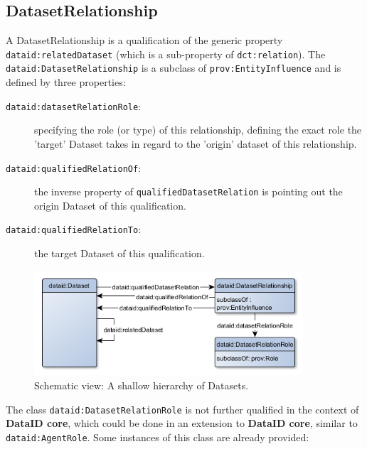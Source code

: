 \documentclass[a4paper,english,twoside,BCOR1.5cm,headsepline,DIV12,appendixprefix,final,12pt]{scrbook}
\newcommand{\core}{{\ttfamily\bfseries DataID core}\xspace}
\newcommand{\prop}[1]{{{\texttt{#1}}}}
\begin{document}
\subsection{DatasetRelationship} 
\label{sec:corerelation}
A DatasetRelationship is a qualification of the generic property \prop{dataid:relatedDataset} (which is a sub-property of \prop{dct:relation}). The \prop{dataid:DatasetRelationship} is a subclass of \prop{prov:EntityInfluence} and is defined by three properties:

\begin{description}
\item[\prop{dataid:datasetRelationRole}:] specifying the role (or type) of this relationship, defining the exact role the 'target' Dataset takes in regard to the 'origin' dataset of this relationship.
\item[\prop{dataid:qualifiedRelationOf}:] the inverse property of \prop{qualifiedDatasetRelation} is pointing out the origin Dataset of this qualification.
\item[\prop{dataid:qualifiedRelationTo}:] the target Dataset of this qualification.
\end{description}

\begin{figure}[!htbp]
\centering
  \includegraphics[width=10cm]{images/ClassDatasetRelationship.png}
  \caption{Schematic view: A shallow hierarchy of Datasets.}
  \label{fig:example}
\end{figure}

The class \prop{dataid:DatasetRelationRole} is not further qualified in the context of \core, which could be done in an extension to \core, similar to \prop{dataid:AgentRole}. Some instances of this class are already provided:
\end{document}
